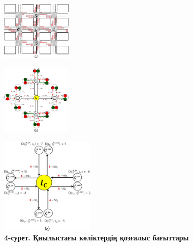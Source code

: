 \begin{figure}[H]
	\centering
	\includegraphics[width=0.3\textwidth]{assets/165}
	\caption*{}
\end{figure}

\begin{figure}[H]
	\centering
	\includegraphics[width=0.3\textwidth]{assets/166}
	\caption*{}
\end{figure}

\begin{figure}[H]
	\centering
	\includegraphics[width=0.4\textwidth]{assets/167}
	\caption*{\bfseries 4-сурет. Қиылыстағы көліктердің қозғалыс бағыттары}
\end{figure}



